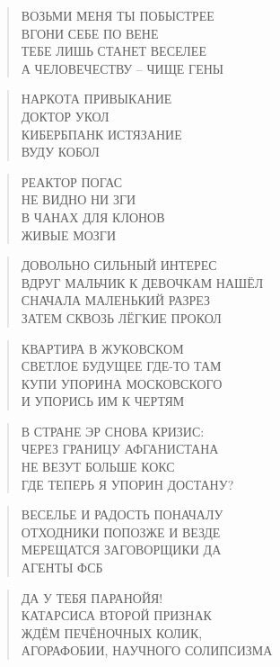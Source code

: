 \poemtitle{***}
\begin{verse}
ВОЗЬМИ МЕНЯ ТЫ ПОБЫСТРЕЕ\\
ВГОНИ СЕБЕ ПО ВЕНЕ\\
ТЕБЕ ЛИШЬ СТАНЕТ ВЕСЕЛЕЕ\\
А ЧЕЛОВЕЧЕСТВУ -- ЧИЩЕ ГЕНЫ
\end{verse}

\poemtitle{***}
\begin{verse}
НАРКОТА ПРИВЫКАНИЕ\\
ДОКТОР УКОЛ\\
КИБЕРБПАНК ИСТЯЗАНИЕ\\
ВУДУ КОБОЛ
\end{verse}

\poemtitle{***}
\begin{verse}
РЕАКТОР ПОГАС\\
НЕ ВИДНО НИ ЗГИ\\
В ЧАНАХ ДЛЯ КЛОНОВ\\
ЖИВЫЕ МОЗГИ
\end{verse}

\poemtitle{***}
\begin{verse}
ДОВОЛЬНО СИЛЬНЫЙ ИНТЕРЕС \\
ВДРУГ МАЛЬЧИК К ДЕВОЧКАМ НАШЁЛ\\
СНАЧАЛА МАЛЕНЬКИЙ РАЗРЕЗ\\
ЗАТЕМ СКВОЗЬ ЛЁГКИЕ ПРОКОЛ
\end{verse}

\poemtitle{***}
\begin{verse}
КВАРТИРА В ЖУКОВСКОМ\\
СВЕТЛОЕ БУДУЩЕЕ ГДЕ-ТО ТАМ\\
КУПИ УПОРИНА МОСКОВСКОГО\\
И УПОРИСЬ ИМ К ЧЕРТЯМ
\end{verse}

\poemtitle{***}
\begin{verse}
В СТРАНЕ ЭР СНОВА КРИЗИС:\\
ЧЕРЕЗ ГРАНИЦУ АФГАНИСТАНА\\
НЕ ВЕЗУТ БОЛЬШЕ КОКС\\
ГДЕ ТЕПЕРЬ Я УПОРИН ДОСТАНУ?
\end{verse}

\poemtitle{***}
\begin{verse}
ВЕСЕЛЬЕ И РАДОСТЬ ПОНАЧАЛУ\\
ОТХОДНИКИ ПОПОЗЖЕ И ВЕЗДЕ\\
МЕРЕЩАТСЯ ЗАГОВОРЩИКИ ДА\\
АГЕНТЫ ФСБ
\end{verse}

\poemtitle{***}
\begin{verse}
ДА У ТЕБЯ ПАРАНОЙЯ!\\
КАТАРСИСА ВТОРОЙ ПРИЗНАК\\
ЖДЁМ ПЕЧЁНОЧНЫХ КОЛИК,\\
АГОРАФОБИИ, НАУЧНОГО СОЛИПСИЗМА
\end{verse}

